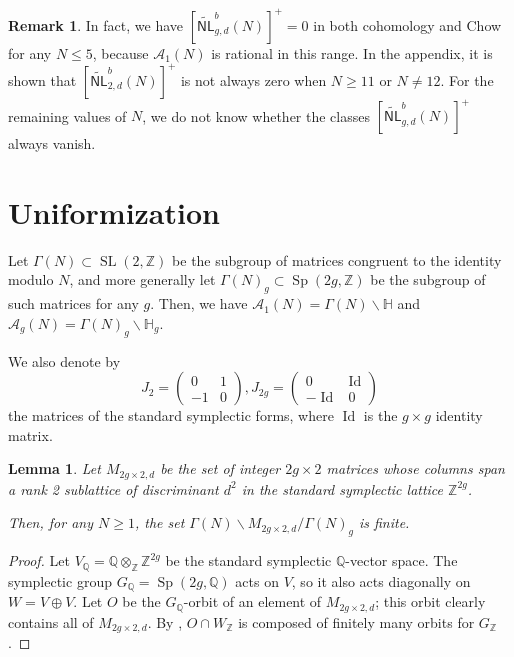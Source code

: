 \documentclass[12pt]{amsart}
\def\cA{\mathcal{A}}
\def\bH{\mathbb{H}}
\def\bQ{\mathbb{Q}}
\def\bZ{\mathbb{Z}}
\DeclareMathOperator{\Id}{Id}
\DeclareMathOperator{\SL}{SL}
\DeclareMathOperator{\Sp}{Sp}
\newcommand{\wNL}{{\widetilde{\mathsf{NL}}}}
\newtheorem{lem}[thm]{Lemma}
\theoremstyle{definition}
\newtheorem{rem}[thm]{Remark}
\begin{document}
\begin{rem}\label{N<=5}
In fact, we have $[\wNL^b_{g,d}(N)]^+=0$ in both cohomology and Chow for any $N\le 5$, because $\cA_1(N)$ is rational in this range. In the appendix, it is shown that $[\wNL^b_{2,d}(N)]^+$ is not always zero when $N\ge 11$ or $N\neq12$. For the remaining values of $N$, we do not know whether the classes $[\wNL^b_{g,d}(N)]^+$ always vanish.
\end{rem}

\section{Uniformization}

Let $\Gamma(N)\subset\SL(2,\bZ)$ be the subgroup of matrices congruent to the identity modulo $N$, and more generally let $\Gamma(N)_g\subset\Sp(2g,\bZ)$ be the subgroup of such matrices for any $g$. Then, we have $\cA_1(N)=\Gamma(N)\backslash\bH$ and $\cA_g(N)=\Gamma(N)_g\backslash\bH_g$.

We also denote by
\begin{equation*}
    J_2=
    \begin{pmatrix}
        0 & 1 \\
        -1 & 0
    \end{pmatrix}
    ,
    J_{2g}=
        \begin{pmatrix}
        0 & \Id \\
        -\Id & 0
    \end{pmatrix}
\end{equation*}
the matrices of the standard symplectic forms, where $\Id$ is the $g\times g$ identity matrix.

\begin{lem}\label{borel}
Let $M_{2g\times 2,d}$ be the set of integer $2g\times 2$ matrices whose columns span a rank 2 sublattice of discriminant $d^2$ in the standard symplectic lattice $\bZ^{2g}$.

Then, for any $N\ge1$, the set $\Gamma(N)\backslash M_{2g\times 2,d}/\Gamma(N)_g$ is finite.
\end{lem}


\begin{proof}
Let $V_\bQ= \bQ\otimes_\bZ \bZ^{2g}$ be the standard symplectic $\bQ$-vector space. The symplectic group $G_\bQ=\Sp(2g,\bQ)$ acts on $V$, so it also acts diagonally on $W=V\oplus V$. Let $O$ be the $G_\bQ$-orbit of an element of $M_{2g\times 2,d}$; this orbit clearly contains all of $M_{2g\times 2,d}$. By \cite[Theorem 9.11]{borel}, $O\cap W_{\bZ}$ is composed of finitely many orbits for $G_\bZ$.
\end{proof}
\end{document}
